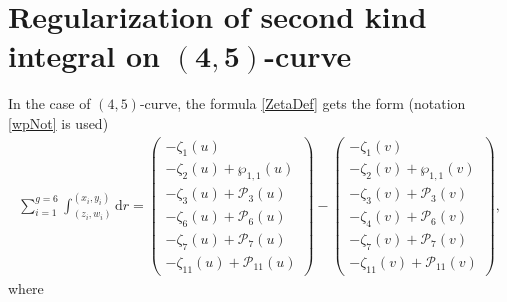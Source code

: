 \documentclass[pdftex]{sigma}
\numberwithin{equation}{section}
\newcommand{\rmd}{\mathrm{d}}
\begin{document}
\section[Regularization of second kind integral on $(4,5)$-curve]{Regularization of second kind integral on $\boldsymbol{(4,5)}$-curve}\label{A:Reg45}
In the case of $(4,5)$-curve, the formula \eqref{ZetaDef} gets the form (notation \eqref{wpNot} is used)
\begin{gather*}%
 \sum_{i=1}^{g=6} \int_{(z_i,w_i)}^{(x_i,y_i)} \rmd r = \begin{pmatrix}
 -\zeta_1(u) \\
 -\zeta_2(u) + \wp_{1,1}(u)\\
 -\zeta_3(u) + \mathcal{P}_3(u) \\
 -\zeta_6(u) + \mathcal{P}_6(u) \\
 -\zeta_7(u) + \mathcal{P}_7(u)\\
 -\zeta_{11}(u) + \mathcal{P}_{11}(u) \end{pmatrix}
 - \begin{pmatrix}
 -\zeta_1(v) \\
 -\zeta_2(v) + \wp_{1,1}(v)\\
 -\zeta_3(v) + \mathcal{P}_3(v) \\
 -\zeta_4(v) + \mathcal{P}_6(v) \\
 -\zeta_7(v) + \mathcal{P}_7(v)\\
 -\zeta_{11}(v) + \mathcal{P}_{11}(v) \end{pmatrix},
\end{gather*}
where
\end{document}
